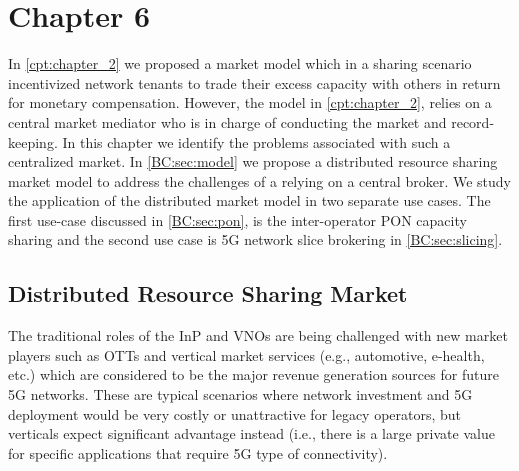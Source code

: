 \chapter*{Chapter 6}

In \autoref{cpt:chapter_2} we proposed a market model which in a sharing scenario incentivized network tenants to trade their excess capacity with others in return for monetary compensation. However, the model in \autoref{cpt:chapter_2}, relies on a central market mediator who is in charge of conducting the market and record-keeping. In this chapter we identify the problems associated with such a centralized market. In \autoref{BC:sec:model} we propose a distributed resource sharing market model to address the challenges of a relying on a central broker. We study the application of the distributed market model in two separate use cases. The first use-case discussed in \autoref{BC:sec:pon}, is the inter-operator \ac{PON} capacity sharing and the second use case is \ac{5G} network slice brokering in \autoref{BC:sec:slicing}.



\section{Distributed Resource Sharing Market}
\label{BC:sec:model}
The traditional roles of the \ac{InP} and \acp{VNO} are being challenged with new market players such as \acp{OTT} and vertical market services (e.g., automotive, e-health, etc.) which are considered to be the major revenue generation sources for future \ac{5G} networks.
These are typical scenarios where network investment and \ac{5G} deployment would be very costly or unattractive for legacy operators, but verticals expect significant advantage instead (i.e., there is a large private value for specific applications that require \ac{5G} type of connectivity).

